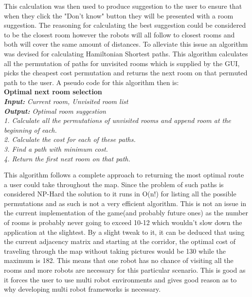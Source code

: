       This calculation was then used to produce suggestion to the user to ensure that when they click the "Don't know" button they will be presented with a room suggestion. The reasoning for calculating the best suggestion could be considered to be the closest room however the robots will all follow to closest rooms and both will cover the same amount of distances. To alleviate this issue an algorithm was devised for calculating Hamiltonian Shortest paths. This algorithm calculates all the permutation of paths for unvisited rooms which is supplied by the GUI, picks the cheapest cost permutation and returns the next room on that permuted path to the user. A pseudo code for this algorithm then is:\\
      \textbf{Optimal next room selection}\\
      \emph{
        \textbf{Input: } Current room, Unvisited room list\\
        \textbf{Output: } Optimal room suggestion\\
        1. Calculate all the permutations of unvisited rooms and append room at the beginning of each.\\
        2. Calculate the cost for each of these paths.\\
        3. Find a path with minimum cost.\\
        4. Return the first next room on that path.\\
      }

      This algorithm follows a complete approach to returning the most optimal route a user could take throughout the map. Since the problem of such paths is considered NP-Hard the solution to it runs in O(n!) for listing all the possible permutations and as such is not a very efficient algorithm. This is not an issue in the current implementation of the game(and probably future ones) as the number of rooms is probably never going to exceed 10-12 which wouldn't slow down the application at the slightest. By a slight tweak to it, it can be deduced that using the current adjacency matrix and starting at the corridor, the optimal cost of traveling through the map without taking pictures would be 130 while the maximum is 182. This means that one robot has no chance of visiting all the rooms and more robots are necessary for this particular scenario. This is good as it forces the user to use multi robot environments and gives good reason as to why developing multi robot frameworks is necessary.

